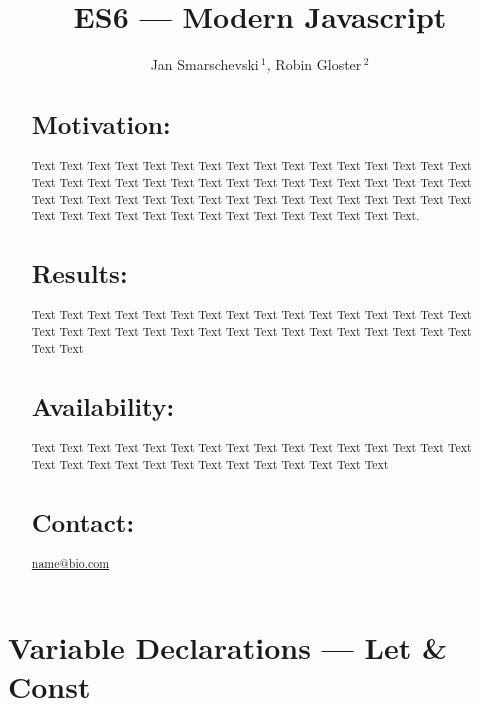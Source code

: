 \documentclass{bioinfo}
\begin{document}

\title[short Title]{ES6 --- Modern Javascript}
\author[Sample \textit{et~al}]{Jan Smarschevski\,$^{1}$, Robin Gloster\,$^{2}$}
\address{$^{1}$Department of XXXXXXX, Address XXXX etc.\\
$^{2}$robin.gloster@tum.de}



\maketitle

\begin{abstract}

\section{Motivation:}
Text Text Text  Text Text Text Text Text Text Text Text
Text  Text Text Text Text Text Text Text Text Text  Text Text Text Text Text Text Text Text Text  Text Text Text Text Text Text Text Text Text  Text Text Text Text Text Text Text Text Text  Text Text Text Text Text Text Text Text Text  Text Text Text Text Text.

\section{Results:}
Text  Text Text Text Text Text Text Text Text Text  Text Text Text Text Text Text Text Text Text  Text Text Text Text Text Text Text Text Text  Text Text Text Text Text Text

\section{Availability:}
Text  Text Text Text Text Text Text Text Text Text  Text Text Text Text Text Text Text Text Text  Text Text Text Text Text Text Text Text Text  Text

\section{Contact:} \href{name@bio.com}{name@bio.com}
\end{abstract}

\section{Variable Declarations --- Let \& Const}
\end{document}
